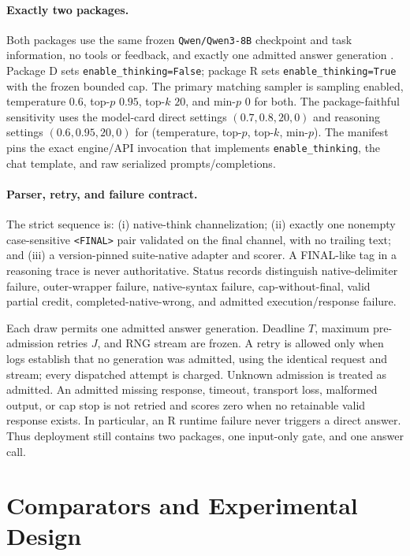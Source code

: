 \documentclass{article}
\newcommand{\D}{\ensuremath{\mathrm{D}}}
\newcommand{\Rpol}{\ensuremath{\mathrm{R}}}
\newcommand{\1}{\mathbb{I}}
\begin{document}
\paragraph{Exactly two packages.}
Both packages use the same frozen \texttt{Qwen/Qwen3-8B} checkpoint and task information, no tools or feedback, and exactly one admitted answer generation \citep{yang2025qwen3,qwen3modelcard2026}. Package \D{} sets \texttt{enable\_thinking=False}; package \Rpol{} sets \texttt{enable\_thinking=True} with the frozen bounded cap. The primary matching sampler is sampling enabled, temperature $0.6$, top-$p$ $0.95$, top-$k$ $20$, and min-$p$ $0$ for both. The package-faithful sensitivity uses the model-card direct settings $(0.7,0.8,20,0)$ and reasoning settings $(0.6,0.95,20,0)$ for (temperature, top-$p$, top-$k$, min-$p$). The manifest pins the exact engine/API invocation that implements \texttt{enable\_thinking}, the chat template, and raw serialized prompts/completions.

\paragraph{Parser, retry, and failure contract.}
The strict sequence is: (i) native-think channelization; (ii) exactly one nonempty case-sensitive \texttt{<FINAL>} pair validated on the final channel, with no trailing text; and (iii) a version-pinned suite-native adapter and scorer. A FINAL-like tag in a reasoning trace is never authoritative. Status records distinguish native-delimiter failure, outer-wrapper failure, native-syntax failure, cap-without-final, valid partial credit, completed-native-wrong, and admitted execution/response failure.

Each draw permits one admitted answer generation. Deadline $T$, maximum pre-admission retries $J$, and RNG stream are frozen. A retry is allowed only when logs establish that no generation was admitted, using the identical request and stream; every dispatched attempt is charged. Unknown admission is treated as admitted. An admitted missing response, timeout, transport loss, malformed output, or cap stop is not retried and scores zero when no retainable valid response exists. In particular, an \Rpol{} runtime failure never triggers a direct answer. Thus deployment still contains two packages, one input-only gate, and one answer call.

\section{Comparators and Experimental Design}
\end{document}
